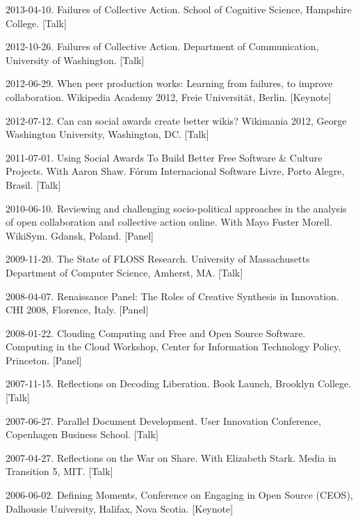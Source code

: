 \documentclass[10pt]{article}
\newenvironment{cvlist}{
\begin{list}{}{\leftmargin=3.0em \itemindent=-3.0em}
  \setlength{\itemsep}{0pt}
  \setlength{\parskip}{0em}
  \setlength{\parsep}{1em}
  \setlength{\parindent}{0em}}
{\vspace{1em}
\end{list}}
\begin{document}
\begin{cvlist}

\item 2013-04-10. Failures of Collective Action. School of Cognitive Science, Hampshire College. [Talk]

\item 2012-10-26. Failures of Collective Action. Department of Communication, University of Washington. [Talk]

\item 2012-06-29. When peer production works: Learning from failures, to improve collaboration. Wikipedia Academy 2012, Freie Universität, Berlin. [Keynote]

\item 2012-07-12. Can can social awards create better wikis? Wikimania 2012, George Washington University, Washington, DC. [Talk]

\item 2011-07-01. Using Social Awards To Build Better Free Software \& Culture Projects.  With Aaron Shaw. Fórum Internacional Software Livre, Porto Alegre, Brasil. [Talk]

\item 2010-06-10. Reviewing and challenging socio-political approaches in the analysis of open collaboration and collective action online. With Mayo Fuster Morell. WikiSym. Gdansk, Poland. [Panel]

\item 2009-11-20. The State of FLOSS Research. University of Massachusetts Department of Computer Science, Amherst, MA. [Talk]

\item 2008-04-07. Renaissance Panel: The Roles of Creative Synthesis in Innovation. CHI 2008, Florence, Italy. [Panel]

\item 2008-01-22. Clouding Computing and Free and Open Source Software. Computing in the Cloud Workshop, Center for Information Technology Policy, Princeton. [Panel]

\item 2007-11-15. Reflections on Decoding Liberation. Book Launch, Brooklyn College. [Talk]

\item 2007-06-27. Parallel Document Development. User Innovation Conference, Copenhagen Business School. [Talk]

\item 2007-04-27. Reflections on the War on Share. With Elizabeth Stark. Media in Transition 5, MIT. [Talk]

\item 2006-06-02. Defining Moments, Conference on Engaging in Open Source (CEOS), Dalhousie University, Halifax, Nova Scotia. [Keynote]

\end{cvlist}
\end{document}
